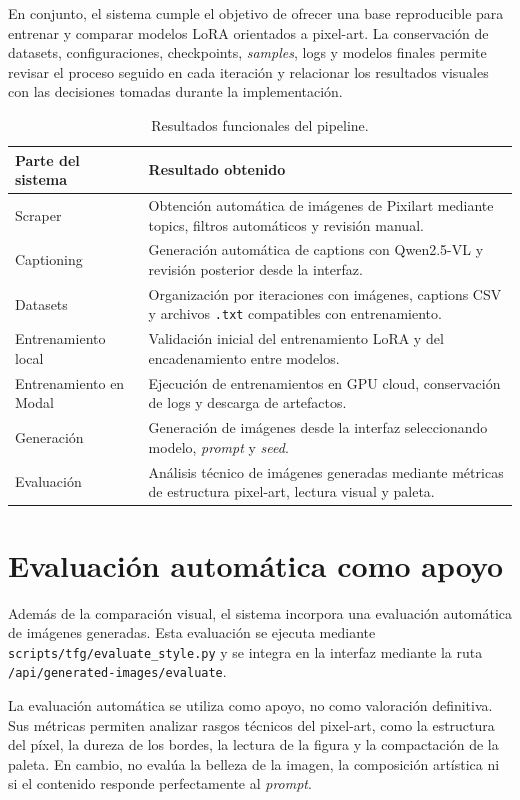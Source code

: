\documentclass[a4paper,11pt,titlepage]{scrbook}
\newcommand{\estilotabla}{%
    \small
    \setlength{\tabcolsep}{4pt}
    \renewcommand{\arraystretch}{1.15}
}
\begin{document}
\medskip

En conjunto, el sistema cumple el objetivo de ofrecer una base reproducible para entrenar y comparar modelos LoRA orientados a pixel-art. La conservación de datasets, configuraciones, checkpoints, \textit{samples}, logs y modelos finales permite revisar el proceso seguido en cada iteración y relacionar los resultados visuales con las decisiones tomadas durante la implementación.

\begin{table}[H]
\centering
\estilotabla
\begin{tabular}{|L{0.22\textwidth}|L{0.64\textwidth}|}
\hline
\textbf{Parte del sistema} & \textbf{Resultado obtenido} \tabularnewline
\hline
Scraper & Obtención automática de imágenes de Pixilart mediante topics, filtros automáticos y revisión manual. \tabularnewline
\hline
Captioning & Generación automática de captions con Qwen2.5-VL y revisión posterior desde la interfaz. \tabularnewline
\hline
Datasets & Organización por iteraciones con imágenes, captions CSV y archivos \texttt{.txt} compatibles con entrenamiento. \tabularnewline
\hline
Entrenamiento local & Validación inicial del entrenamiento LoRA y del encadenamiento entre modelos. \tabularnewline
\hline
Entrenamiento en Modal & Ejecución de entrenamientos en GPU cloud, conservación de logs y descarga de artefactos. \tabularnewline
\hline
Generación & Generación de imágenes desde la interfaz seleccionando modelo, \textit{prompt} y \textit{seed}. \tabularnewline
\hline
Evaluación & Análisis técnico de imágenes generadas mediante métricas de estructura pixel-art, lectura visual y paleta. \tabularnewline
\hline
\end{tabular}
\caption{Resultados funcionales del pipeline.}
\label{tab:resultados_pipeline_funcional}
\end{table}


\FloatBarrier

\section{Evaluación automática como apoyo}

Además de la comparación visual, el sistema incorpora una evaluación automática de imágenes generadas. Esta evaluación se ejecuta mediante \texttt{scripts/tfg/evaluate_style.py} y se integra en la interfaz mediante la ruta \texttt{/api/generated-images/evaluate}.

\medskip

La evaluación automática se utiliza como apoyo, no como valoración definitiva. Sus métricas permiten analizar rasgos técnicos del pixel-art, como la estructura del píxel, la dureza de los bordes, la lectura de la figura y la compactación de la paleta. En cambio, no evalúa la belleza de la imagen, la composición artística ni si el contenido responde perfectamente al \textit{prompt}.
\end{document}
